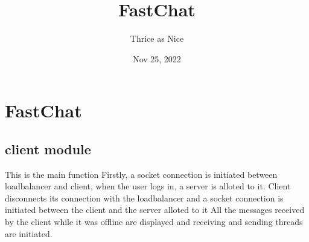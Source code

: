 \documentclass[letterpaper,10pt,english]{sphinxmanual}
\title{FastChat}
\date{Nov 25, 2022}
\author{Thrice as Nice}
\begin{document}
\pagestyle{empty}
\sphinxmaketitle
\pagestyle{plain}
\sphinxtableofcontents
\pagestyle{normal}
\label{\detokenize{index::doc}}



\chapter{FastChat}
\label{\detokenize{modules:fastchat}}\label{\detokenize{modules::doc}}

\section{client module}
\label{\detokenize{client:module-client}}\label{\detokenize{client:client-module}}\label{\detokenize{client::doc}}

\begin{fulllineitems}
\label{\detokenize{client:client.main}}
\sphinxAtStartPar
This is the main function
Firstly, a socket connection is initiated between loadbalancer and client, when the user logs in, a server is alloted to it.
Client disconnects its connection with the loadbalancer and a socket connection is initiated between the client and the server alloted to it
All the messages received by the client while it was offline are displayed and receiving and sending threads are initiated.

\end{fulllineitems}

\end{document}
